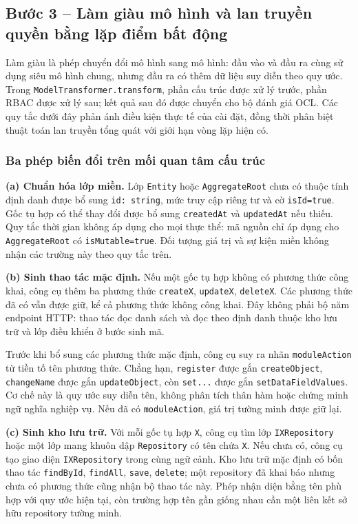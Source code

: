 \subsection{Bước 3 -- Làm giàu mô hình và lan truyền quyền bằng lặp điểm bất động}
\label{sec:buoc3}

Làm giàu là phép chuyển đổi mô hình sang mô hình: đầu vào và đầu ra cùng sử dụng siêu mô hình chung, nhưng đầu ra có thêm dữ liệu suy diễn theo quy ước. Trong \texttt{ModelTransformer.transform}, phần cấu trúc được xử lý trước, phần RBAC được xử lý sau; kết quả sau đó được chuyển cho bộ đánh giá OCL. Các quy tắc dưới đây phản ánh điều kiện thực tế của cài đặt, đồng thời phân biệt thuật toán lan truyền tổng quát với giới hạn vòng lặp hiện có.

\subsubsection{Ba phép biến đổi trên mối quan tâm cấu trúc}

\textbf{(a) Chuẩn hóa lớp miền.} Lớp \texttt{Entity} hoặc \texttt{AggregateRoot} chưa có thuộc tính định danh được bổ sung \texttt{id: string}, mức truy cập riêng tư và cờ \texttt{isId=true}. Gốc tụ hợp có thể thay đổi được bổ sung \texttt{createdAt} và \texttt{updatedAt} nếu thiếu. Quy tắc thời gian không áp dụng cho mọi thực thể: mã nguồn chỉ áp dụng cho \texttt{AggregateRoot} có \texttt{isMutable=true}. Đối tượng giá trị và sự kiện miền không nhận các trường này theo quy tắc trên.

\textbf{(b) Sinh thao tác mặc định.} Nếu một gốc tụ hợp không có phương thức công khai, công cụ thêm ba phương thức \texttt{createX}, \texttt{updateX}, \texttt{deleteX}. Các phương thức đã có vẫn được giữ, kể cả phương thức không công khai. Đây không phải bộ năm endpoint HTTP: thao tác đọc danh sách và đọc theo định danh thuộc kho lưu trữ và lớp điều khiển ở bước sinh mã.

Trước khi bổ sung các phương thức mặc định, công cụ suy ra nhãn \texttt{moduleAction} từ tiền tố tên phương thức. Chẳng hạn, \texttt{register} được gắn \texttt{createObject}, \texttt{changeName} được gắn \texttt{updateObject}, còn \texttt{set...} được gắn \texttt{setDataFieldValues}. Cơ chế này là quy ước suy diễn tên, không phân tích thân hàm hoặc chứng minh ngữ nghĩa nghiệp vụ. Nếu đã có \texttt{moduleAction}, giá trị tường minh được giữ lại.

\textbf{(c) Sinh kho lưu trữ.} Với mỗi gốc tụ hợp \texttt{X}, công cụ tìm lớp \texttt{IXRepository} hoặc một lớp mang khuôn dập \texttt{Repository} có tên chứa \texttt{X}. Nếu chưa có, công cụ tạo giao diện \texttt{IXRepository} trong cùng ngữ cảnh. Kho lưu trữ mặc định có bốn thao tác \texttt{findById}, \texttt{findAll}, \texttt{save}, \texttt{delete}; một repository đã khai báo nhưng chưa có phương thức cũng nhận bộ thao tác này. Phép nhận diện bằng tên phù hợp với quy ước hiện tại, còn trường hợp tên gần giống nhau cần một liên kết sở hữu repository tường minh.

